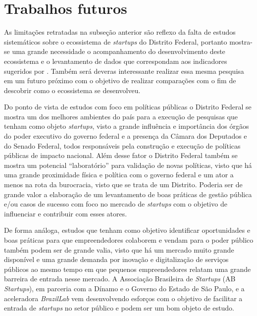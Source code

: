 \section{Trabalhos futuros}
\label{subsection:trabalhos_futuros}

As limitações retratadas na subseção anterior são reflexo da falta de estudos sistemáticos sobre o ecossistema de \textit{startups} do Distrito Federal, portanto mostra-se uma grande necessidade o acompanhamento do desenvolvimento deste ecossistema e o levantamento de dados que correspondam aos indicadores sugeridos por . Também será deveras interessante realizar essa mesma pesquisa em um futuro próximo com o objetivo de realizar comparações com o fim de descobrir como o ecossistema se desenvolveu.

Do ponto de vista de estudos com foco em políticas públicas o Distrito Federal se mostra um dos melhores ambientes do país para a execução de pesquisas que tenham como objeto \textit{startups}, visto a grande influência e importância dos órgãos do poder executivo do governo federal e a presença da Câmara dos Deputados e do Senado Federal, todos responsáveis pela construção e execução de políticas públicas de impacto nacional. Além desse fator o Distrito Federal também se mostra um potencial ``laboratório'' para validação de novas políticas, visto que há uma grande proximidade física e política com o governo federal e um ator a menos na rota da burocracia, visto que se trata de um Distrito. Poderia ser de grande valor a elaboração de um levantamento de boas práticas de gestão pública e/ou casos de sucesso com foco no mercado de \textit{startups} com o objetivo de influenciar e contribuir com esses atores. 

De forma análoga, estudos que tenham como objetivo identificar oportunidades e boas práticas para que empreendedores colaborem e vendam para o poder público também podem ser de grande valia, visto que há um mercado muito grande disponível e uma grande demanda por inovação e digitalização de serviços públicos ao mesmo tempo em que pequenos empreendedores relatam uma grande barreira de entrada nesse mercado. A Associação Brasileira de \textit{Startups} (AB \textit{Startups}), em parceria com a Dínamo e o Governo do Estado de São Paulo, e a aceleradora \textit{BrazilLab} vem desenvolvendo esforços com o objetivo de facilitar a entrada de \textit{startups} no setor público e podem ser um bom objeto de estudo.